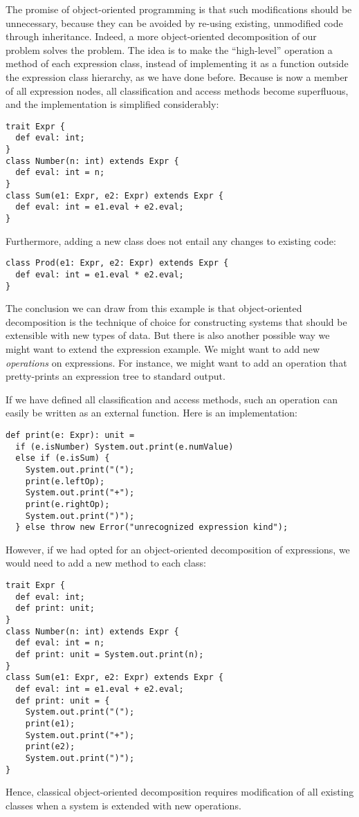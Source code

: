 The promise of object-oriented programming is that such modifications
should be unnecessary, because they can be avoided by re-using
existing, unmodified code through inheritance. Indeed, a more
object-oriented decomposition of our problem solves the problem.  The
idea is to make the ``high-level'' operation  a method of
each expression class, instead of implementing it as a function
outside the expression class hierarchy, as we have done
before. Because  is now a member of all expression nodes,
all classification and access methods become superfluous, and the implementation is simplified considerably:
\begin{lstlisting}
trait Expr {
  def eval: int;
}
class Number(n: int) extends Expr {
  def eval: int = n;
}
class Sum(e1: Expr, e2: Expr) extends Expr {
  def eval: int = e1.eval + e2.eval;
}
\end{lstlisting}
Furthermore, adding a new  class does not entail any changes to existing code:
\begin{lstlisting}
class Prod(e1: Expr, e2: Expr) extends Expr {
  def eval: int = e1.eval * e2.eval;
}
\end{lstlisting}

The conclusion we can draw from this example is that object-oriented
decomposition is the technique of choice for constructing systems that
should be extensible with new types of data. But there is also another
possible way we might want to extend the expression example. We might
want to add new {\em operations} on expressions.  For instance, we might
want to add an operation that pretty-prints an expression tree to standard output.

If we have defined all classification and access methods, such an
operation can easily be written as an external function. Here is an
implementation:
\begin{lstlisting}
def print(e: Expr): unit = 
  if (e.isNumber) System.out.print(e.numValue)
  else if (e.isSum) {
    System.out.print("("); 
    print(e.leftOp); 
    System.out.print("+");
    print(e.rightOp);
    System.out.print(")");
  } else throw new Error("unrecognized expression kind");
\end{lstlisting}
However, if we had opted for an object-oriented decomposition of
expressions, we would need to add a new  method
to each class:
\begin{lstlisting}
trait Expr {
  def eval: int;
  def print: unit;
}
class Number(n: int) extends Expr {
  def eval: int = n;
  def print: unit = System.out.print(n);
}
class Sum(e1: Expr, e2: Expr) extends Expr {
  def eval: int = e1.eval + e2.eval;
  def print: unit = {
    System.out.print("("); 
    print(e1); 
    System.out.print("+");
    print(e2);
    System.out.print(")");
}
\end{lstlisting}
Hence, classical object-oriented decomposition requires modification
of all existing classes when a system is extended with new operations.

